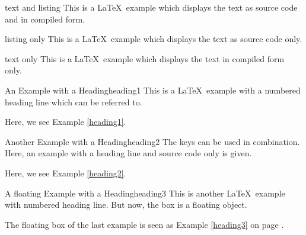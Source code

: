 \begin{dispExample}
\begin{texexp}{text and listing}
This is a \LaTeX\ example which displays the text as source code
and in compiled form.
\end{texexp}
\end{dispExample}


\begin{dispExample}
\begin{texexp}{listing only}
This is a \LaTeX\ example which displays the text as source code only.
\end{texexp}
\end{dispExample}


\begin{dispExample}
\begin{texexp}{text only}
This is a \LaTeX\ example which displays the text in compiled form only.
\end{texexp}
\end{dispExample}


\begin{dispExample}
\begin{texexptitled}{An Example with a Heading}{heading1}
This is a \LaTeX\ example with a numbered heading line
which can be referred to.
\end{texexptitled}
Here, we see Example \ref{heading1}.
\end{dispExample}


\begin{dispExample}
\begin{texexptitled}{Another Example with a Heading}{heading2}
The keys can be used in combination. Here, an example with a heading line
and source code only is given.
\end{texexptitled}
Here, we see Example \ref{heading2}.
\end{dispExample}


\begin{dispListing}
\begin{texexptitled}[float]{A floating Example with a Heading}{heading3}
This is another \LaTeX\ example with numbered heading line.
But now, the box is a floating object.
\end{texexptitled}
\end{dispListing}
\tcbusetemp

\begin{dispExample}
The floating box of the last example is seen as Example \ref{heading3}
on page \pageref{heading3}.
\end{dispExample}


